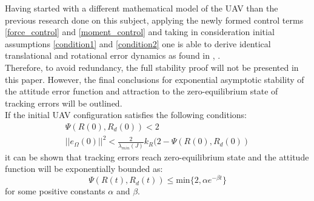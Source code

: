 Having started with a different mathematical model of the UAV than the previous research done on this subject, applying the newly formed control terms \ref{force_control} and \ref{moment_control} and taking in consideration initial assumptions \ref{condition1} and \ref{condition2} one is able to derive identical translational and rotational error dynamics as found in \cite{LeeClanak1}, \cite{LeeClanak4}. \\
Therefore, to avoid redundancy, the full stability proof will not be presented in this paper. However, the final conclusions for exponential asymptotic stability of the attitude error function and attraction to the zero-equilibrium state of tracking errors will be outlined. \\

If the initial UAV configuration satisfies the following conditions:
\begin{gather}
	\Psi (R(0), R_d(0)) < 2 \\
	||e_\Omega(0)||^2 < \frac{2}{\lambda_{min}(J)}k_R(2 - \Psi(R(0), R_d(0))
\end{gather}
it can be shown that tracking errors reach zero-equilibrium state and the attitude function will be exponentially bounded as:
\begin{equation}
	\Psi(R(t), R_d(t)) \leq \text{min}\{2, \alpha e^{-\beta t} \}
\end{equation}
for some positive constants $\alpha$ and $\beta$.
